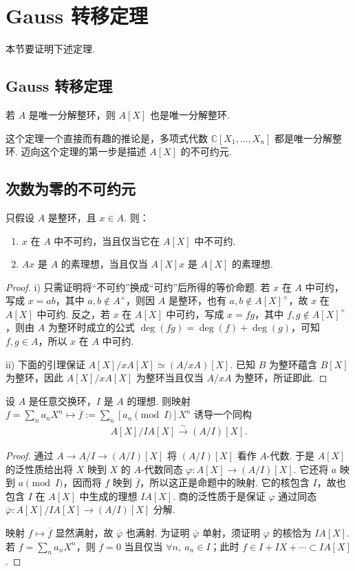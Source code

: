\section{Gauss 转移定理}\label{sec:galois-1-7}
本节要证明下述定理.
\subsection{Gauss 转移定理}\label{sec:galois-1-7-1}
\begin{theorem*}
若 $A$ 是唯一分解整环，则 $A[X]$ 也是唯一分解整环.
\end{theorem*}
这个定理一个直接而有趣的推论是，多项式代数 $\mathbb C[X_1,\ldots,X_n]$ 都是唯一分解整环.
迈向这个定理的第一步是描述 $A[X]$ 的不可约元.
\subsection{次数为零的不可约元}\label{sec:galois-1-7-2}
\begin{proposition*}
只假设 $A$ 是整环，且 $x\in A$. 则：
\begin{enumerate}[label=\roman*)]
\item $x$ 在 $A$ 中不可约，当且仅当它在 $A[X]$ 中不可约.
\item $Ax$ 是 $A$ 的素理想，当且仅当 $A[X]x$ 是 $A[X]$ 的素理想.
\end{enumerate}
\end{proposition*}
\begin{proof}
i) 只需证明将``不可约''换成``可约''后所得的等价命题. 若 $x$ 在 $A$ 中可约，写成 $x=ab$，其中 $a,b\notin A^\times$，则因 $A$ 是整环，也有 $a,b\notin A[X]^\times$，故 $x$ 在 $A[X]$ 中可约. 反之，若 $x$ 在 $A[X]$ 中可约，写成 $x=fg$，其中 $f,g\notin A[X]^\times$，则由 $A$ 为整环时成立的公式 $\deg(fg)=\deg(f)+\deg(g)$，可知 $f,g\in A$，所以 $x$ 在 $A$ 中可约.

ii) 下面的引理保证 $A[X]/xA[X]\simeq(A/xA)[X]$. 已知 $B$ 为整环蕴含 $B[X]$ 为整环，因此 $A[X]/xA[X]$ 为整环当且仅当 $A/xA$ 为整环，所证即此.
\end{proof}
\begin{lemma*}
设 $A$ 是任意交换环，$I$ 是 $A$ 的理想. 则映射 $f=\sum_n a_nX^n\mapsto\overline f:=\sum_n[a_n\pmod I]X^n$ 诱导一个同构
\begin{align*}
A[X]/IA[X]\xrightarrow{\sim}(A/I)[X].
\end{align*}
\end{lemma*}
\begin{proof}
通过 $A\longrightarrow A/I\longrightarrow(A/I)[X]$ 将 $(A/I)[X]$ 看作 $A$-代数. 于是 $A[X]$ 的泛性质给出将 $X$ 映到 $X$ 的 $A$-代数同态 $\varphi:A[X]\longrightarrow(A/I)[X]$. 它还将 $a$ 映到 $a\pmod I$，因而将 $f$ 映到 $\overline f$，所以这正是命题中的映射. 它的核包含 $I$，故也包含 $I$ 在 $A[X]$ 中生成的理想 $IA[X]$. 商的泛性质于是保证 $\varphi$ 通过同态 $\overline\varphi:A[X]/IA[X]\longrightarrow(A/I)[X]$ 分解.

映射 $f\mapsto\overline f$ 显然满射，故 $\overline\varphi$ 也满射. 为证明 $\overline\varphi$ 单射，须证明 $\varphi$ 的核恰为 $IA[X]$. 若 $f=\sum_n a_nX^n$，则 $\overline f=0$ 当且仅当 $\forall n,\ a_n\in I$；此时 $f\in I+IX+\cdots\subset IA[X]$.
\end{proof}
